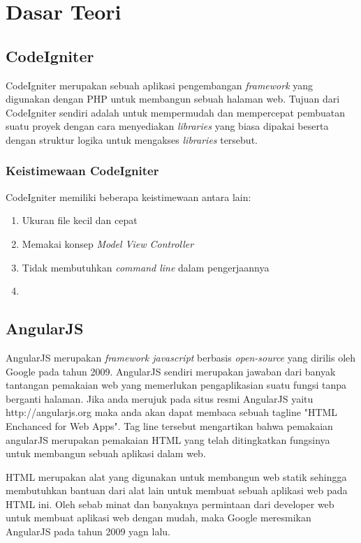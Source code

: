 \chapter{Dasar Teori}
\label{chap: dasarTeori}

\section{CodeIgniter}
\label{codeigniter}

	CodeIgniter merupakan sebuah aplikasi pengembangan \textit{framework} yang digunakan dengan PHP untuk membangun sebuah halaman web. Tujuan dari CodeIgniter sendiri adalah untuk mempermudah dan mempercepat pembuatan suatu proyek dengan cara menyediakan \textit{libraries} yang biasa dipakai beserta dengan struktur logika untuk mengakses \textit{libraries} tersebut.
	
\subsection{Keistimewaan CodeIgniter}
\label{keistimewaanCodeIgniter}
	
	CodeIgniter memiliki beberapa keistimewaan antara lain:
	\begin{enumerate}
		\item Ukuran file kecil dan cepat
		\item Memakai konsep \textit{Model View Controller}
		\item Tidak membutuhkan \textit{command line} dalam pengerjaannya
		\item 
	\end{enumerate}

\section{AngularJS}
\label{sec: angularJS}
	
	AngularJS \cite{angularJS} merupakan \textit{framework javascript} berbasis \textit{open-source} yang dirilis oleh Google pada tahun 2009. AngularJS sendiri merupakan jawaban dari banyak tantangan pemakaian web yang memerlukan pengaplikasian suatu fungsi tanpa berganti halaman. Jika anda merujuk pada situs resmi AngularJS yaitu http://angularjs.org maka anda akan dapat membaca sebuah tagline "HTML Enchanced for Web Apps". Tag line tersebut mengartikan bahwa pemakaian angularJS merupakan pemakaian HTML yang telah ditingkatkan fungsinya untuk membangun sebuah aplikasi dalam web.
	
	HTML merupakan alat yang digunakan untuk membangun web statik sehingga membutuhkan bantuan dari alat lain untuk membuat sebuah aplikasi web pada HTML ini. Oleh sebab minat dan banyaknya permintaan dari developer web untuk membuat aplikasi web dengan mudah, maka Google meresmikan AngularJS pada tahun 2009 yagn lalu.
	
